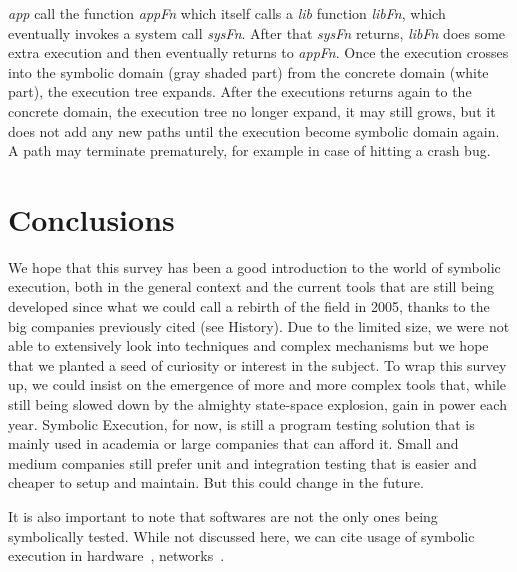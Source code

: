 \documentclass[11pt]{IEEEtran}
\begin{document}
    		\emph{app} call the function \emph{appFn} which itself calls a \emph{lib} function \emph{libFn}, which eventually invokes a system call \emph{sysFn}. After that \emph{sysFn} returns, \emph{libFn} does some extra execution and then eventually returns to \emph{appFn}. Once the execution crosses into the symbolic domain (gray shaded part) from the concrete domain (white part), the execution tree expands. After the executions returns again to the concrete domain, the execution tree no longer expand, it may still grows, but it does not add any new paths until the execution become symbolic domain again. A path may terminate prematurely, for example in case of hitting a crash bug.      
      
      
      
  \section{Conclusions}
    We hope that this survey has been a good introduction to the world of symbolic execution, both in the general context and the current tools that are still being developed since what we could call a rebirth of the field in 2005, thanks to the big companies previously cited (see History). Due to the limited size, we were not able to extensively look into techniques and complex mechanisms but we hope that we planted a seed of curiosity or interest in the subject. To wrap this survey up, we could insist on the emergence of more and more complex tools that, while still being slowed down by the almighty state-space explosion, gain in power each year. Symbolic Execution, for now, is still a program testing solution that is mainly used in academia or large companies that can afford it. Small and medium companies still prefer unit and integration testing that is easier and cheaper to setup and maintain. But this could change in the future.

    It is also important to note that softwares are not the only ones being symbolically tested. While not discussed here, we can cite usage of symbolic execution in hardware~\cite{Hardware}, networks~\cite{220590}.


\pagebreak
{}

\end{document}
